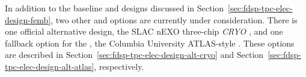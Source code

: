 In addition to the baseline  and  designs discussed in Section~\ref{sec:fdsp-tpc-elec-design-femb}, %
two other  and  options are currently under consideration. %
There is one official alternative design, the SLAC nEXO three-chip \textit{CRYO} , and one fallback option for the  , the Columbia University ATLAS-style  .  These options are described in Section~\ref{sec:fdsp-tpc-elec-design-alt-cryo} and Section~\ref{sec:fdsp-tpc-elec-design-alt-atlas}, respectively.
